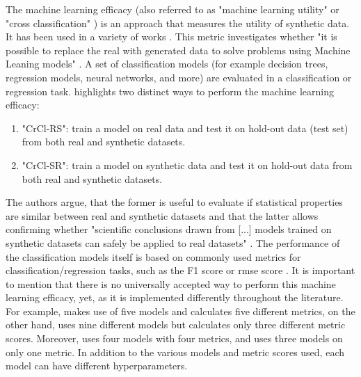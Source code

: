 The machine learning efficacy (also referred to as "machine learning utility" \cite{zhang2021GANBLRTabularData} or "cross classification" \cite{goncalves2020GenerationEvaluationSynthetic}) is an approach that measures the utility of synthetic data. 
It has been used in a variety of works \cite{zhao2022CTABGANEnhancingTabular, xu2019ModelingTabularData, zhang2021GANBLRTabularData, bourou2021ReviewTabularData, ge2021KaminoConstraintawareDifferentially}.
This metric investigates whether "it is possible to replace the real with generated data to solve problems using Machine Leaning models" \cite[p. 7]{bourou2021ReviewTabularData}.
A set of classification models (for example decision trees, regression models, neural networks, and more) are evaluated in a classification or regression task.
\newpage
\textcite[p. 7]{goncalves2020GenerationEvaluationSynthetic} highlights two distinct ways to perform the machine learning efficacy:
\begin{enumerate}
  \item "CrCl-RS": train a \gls{model} on real data and test it on hold-out data (test set) from both real and synthetic datasets.
  \item "CrCl-SR": train a \gls{model} on synthetic data and test it on hold-out data from both real and synthetic datasets.
\end{enumerate}
The authors argue, that the former is useful to evaluate if statistical properties are similar between real and synthetic datasets
and that the latter allows confirming whether "scientific conclusions drawn from [...] models trained on synthetic datasets can safely be applied to real datasets" \cite[p. 7]{goncalves2020GenerationEvaluationSynthetic}.
The performance of the classification models itself is based on commonly used metrics for classification/regression tasks, such as the F1 score or \gls{rmse} score \cite{bourou2021ReviewTabularData, chundawat2022UniversalMetricRobust}.
It is important to mention that there is no universally accepted way to perform this machine learning efficacy, yet, as it is implemented differently throughout the literature.
For example, \cite{zhao2022CTABGANEnhancingTabular} makes use of five models and calculates five different metrics, 
\cite{ge2021KaminoConstraintawareDifferentially} on the other hand, uses nine different models but calculates only three different metric scores.
Moreover, \cite{kunar2021DTGANDifferentialPrivatea} uses four models with four metrics, and \cite{kim2021OCTGANNeuralODEbased} uses three models on only one metric.
In addition to the various models and metric scores used, each \gls{model} can have different hyperparameters.
